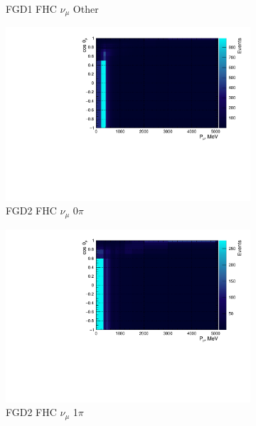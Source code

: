 \begin{figure}
\begin{subfigure}{.32\textwidth}
  \caption{FGD1 FHC $\nu_{\mu}$ Other}
  \label{fig:2d_FGD1_numuCC_other}
\end{subfigure}
\centering
\begin{subfigure}{.32\textwidth}
  \centering
  \includegraphics[width=0.95\linewidth]{figs/NomMC_MC_FGD2_numuCC_0pi}
  \caption{FGD2 FHC $\nu_{\mu}$ 0$\pi$}
  \label{fig:2d_FGD2_numuCC_0pi}
\end{subfigure}
\begin{subfigure}{.32\textwidth}
  \centering
  \includegraphics[width=0.95\linewidth]{figs/NomMC_MC_FGD2_numuCC_1pi}
  \caption{FGD2 FHC $\nu_{\mu}$ 1$\pi$}
  \label{fig:2d_FGD2_numuCC_1pi}
\end{subfigure}
\begin{subfigure}{.32\textwidth}
  \centering

\end{subfigure}
\end{figure}
